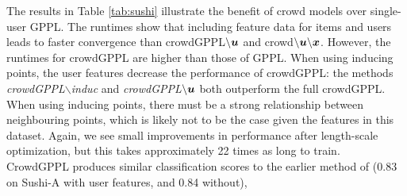 \begin{table}
\caption{Predicting personal preferences: performance on Sushi-A dataset and Sushi-B datasets.
Runtimes given in seconds, with standard deviation between repeats in brackets.
For accuracy, all standard deviations are $\leq 0.02$, for CEE $\leq 0.08$, for Kend. $\leq 0.03$.
 }
\label{tab:sushi}
\end{table}
The results in Table \ref{tab:sushi} 
illustrate the benefit of crowd models over single-user GPPL.
The runtimes 
show that including feature data for items and users leads to faster convergence than crowdGPPL$\backslash \boldsymbol u$ and crowd$\backslash \boldsymbol u \backslash \boldsymbol x$.
 However, the runtimes for crowdGPPL are higher than those of GPPL.
 When using inducing points, the user features decrease the performance of crowdGPPL: the methods \emph{crowdGPPL$\backslash$induc}
 and \emph{crowdGPPL$\backslash\boldsymbol u$} both outperform the full crowdGPPL. 
 When using inducing points,
 there must be a strong relationship between neighbouring points, which
 is likely not to be the case given the features in this dataset.
 Again, we see small improvements in performance after length-scale optimization,
 but this takes approximately 22 times as long to train.
CrowdGPPL produces similar classification scores to the earlier method of 
 \citep{houlsby2012collaborative} (0.83 on Sushi-A with user features, and 0.84 without), 
